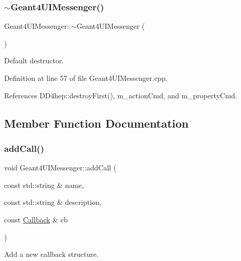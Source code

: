 \subsubsection{\texorpdfstring{$\sim$\+Geant4\+U\+I\+Messenger()}{~Geant4UIMessenger()}}
{\footnotesize\ttfamily Geant4\+U\+I\+Messenger\+::$\sim$\+Geant4\+U\+I\+Messenger (\begin{DoxyParamCaption}{ }\end{DoxyParamCaption})\hspace{0.3cm}{\ttfamily [virtual]}}



Default destructor. 



Definition at line 57 of file Geant4\+U\+I\+Messenger.\+cpp.



References D\+D4hep\+::destroy\+First(), m\+\_\+action\+Cmd, and m\+\_\+property\+Cmd.



\subsection{Member Function Documentation}
\hypertarget{class_d_d4hep_1_1_simulation_1_1_geant4_u_i_messenger_a42b963fb8d55b8fa2f1586098b383d61}{}\label{class_d_d4hep_1_1_simulation_1_1_geant4_u_i_messenger_a42b963fb8d55b8fa2f1586098b383d61} 
\subsubsection{\texorpdfstring{add\+Call()}{addCall()}\hspace{0.1cm}{\footnotesize\ttfamily [1/2]}}
{\footnotesize\ttfamily void Geant4\+U\+I\+Messenger\+::add\+Call (\begin{DoxyParamCaption}\item[{const std\+::string \&}]{name,  }\item[{const std\+::string \&}]{description,  }\item[{const \hyperlink{class_d_d4hep_1_1_callback}{Callback} \&}]{cb }\end{DoxyParamCaption})}



Add a new callback structure. 



